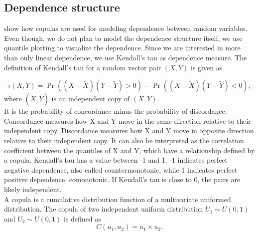 	\subsection{Dependence structure}
	\cite{embrechts2001modelling}  show how copulas are used for modeling dependence between random variables. Even though, we do not plan to model the dependence structure itself, we use quantile plotting to visualize the dependence. Since we are interested in more than only linear dependence, we use Kendall’s tau as dependence measure. The definition of Kendall’s tau for a random vector pair $(X,Y)$ is given as
	
	$$ \tau(X,Y) = \Pr( (X - \widetilde{X}) (Y - \widetilde{Y}) > 0 ) - \Pr( (X - \widetilde{X}) (Y - \widetilde{Y}) < 0 ),$$
	where $(\widetilde{X},\widetilde{Y})$ is an independent copy of $(X,Y)$.\\
	
	It is the probability of concordance minus the probability of discordance. Concordance measures how X and Y move in the same direction relative to their independent copy. Discordance measures how X and Y move in opposite direction relative to their independent copy. It can also be interpreted as the correlation coefficient between the quantiles of X and Y, which have a relationship defined by a copula. Kendall’s tau has a value between -1 and 1. -1 indicates perfect negative dependence, also called countermonotonic, while 1 indicates perfect positive dependence, comonotonic. If Kendall’s tau is close to 0, the pairs are likely independent.\\
	A copula is a cumulative distribution function of a multivariate uniformed distribution. The copula of two independent uniform distribution $U_1 \sim U(0,1)$ and $U_2 \sim U(0,1)$ is defined as
	$$C(u_1,u_2) = u_1 \times u_2.$$
	
